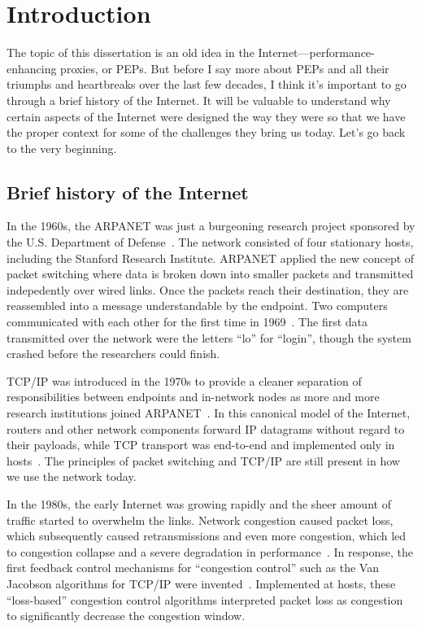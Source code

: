 \chapter{Introduction}
\label{sec:introduction}

The topic of this dissertation is an old idea in the
Internet---performance-enhancing proxies, or PEPs. But before I say more about
PEPs and all their triumphs and heartbreaks over the last few decades, I think
it's important to go through a brief history of the Internet. It will be
valuable to understand why certain aspects of the Internet were designed the
way they were so that we have the proper context for some of the challenges
they bring us today. Let's go back to the very beginning.

\section{Brief history of the Internet}

In the 1960s, the ARPANET was just a burgeoning research project sponsored by
the U.S. Department of Defense~\cite{hauben1997history}. The network consisted
of four stationary hosts,
including the Stanford Research Institute. ARPANET applied the new concept
of packet switching where data is broken down into smaller packets and
transmitted indepedently over wired links. Once the packets reach their
destination, they are reassembled into a message understandable by the
endpoint. Two computers communicated with each other for the first time in
1969~\cite{arpanet2019}. The first data transmitted over the network were the letters ``lo'' for
``login'', though the system crashed before the researchers could finish.

TCP/IP was introduced in the 1970s to provide a cleaner separation of
responsibilities between endpoints and in-network nodes as more and more
research institutions joined ARPANET~\cite{rfc675}. In this canonical model of
the Internet,
routers and other network components forward IP datagrams without regard to
their payloads, while TCP transport was end-to-end and implemented only in
hosts~\cite{saltzer1984endtoend,clark1988darpa}. The principles of packet
switching and TCP/IP are still present in how we use the network today.

In the 1980s, the early Internet was growing rapidly and the sheer amount of
traffic started to overwhelm the links. Network congestion caused packet loss,
which subsequently caused retransmissions and even more congestion, which led
to congestion collapse and a severe degradation in performance~\cite{rfc896}.
In response,
the first feedback control mechanisms for ``congestion control'' such as the
Van Jacobson algorithms for TCP/IP were invented~\cite{vjk}. Implemented at
hosts, these
``loss-based'' congestion control algorithms interpreted packet loss as
congestion to significantly decrease the congestion window.

